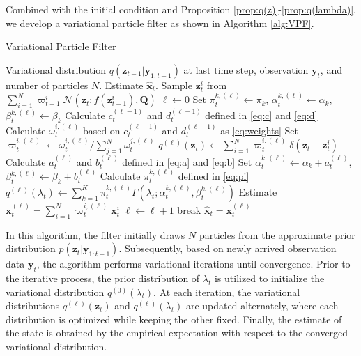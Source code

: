 \documentclass[10pt,twocolumn,twoside]{IEEEtran}
\newcommand{\x}{{ \bm{x} }}
\newcommand{\y}{{ \bm{y} }}
\newcommand{\z}{{ \bm{z} }}
\begin{document}
Combined with the initial condition and Proposition \ref{prop:q(z)}-\ref{prop:q(lambda)}, we develop a variational particle filter as shown in Algorithm \ref{alg:VPF}.
\begin{algorithm}[htbp] 
\label{alg:VPF}
\caption{Variational Particle Filter}
\begin{algorithmic}[1]
\Require Variational distribution $q(\z_{t-1}|\y_{1:t-1})$ at last time step, observation $\y_t$, and number of particles $N$.
\Ensure Estimate $\hat\x_t$.
    \State Sample $\z_t^i$ from $\sum_{i=1}^N\varpi_{t-1}^i\mathcal{N}(\z_t;\overline{f}(\z_{t-1}^i),\overline{\bm{Q}})$\;
\EndFor
\State $\ell \gets 0$\;
    \State Set $\pi_t^{k,(\ell)}\gets\pi_k$, $\alpha_t^{k,(\ell)}\gets\alpha_k$, $\beta_t^{k,(\ell)}\gets\beta_k$\;
\EndFor
{}
    \State Calculate $c_t^{(\ell-1)}$ and $d_t^{(\ell-1)}$ defined in \eqref{eq:c} and \eqref{eq:d}\;
        \State Calculate $\omega_t^{i,(\ell)}$ based on $c_t^{(\ell-1)}$ and $d_t^{(\ell-1)}$ as \eqref{eq:weights}\;
    \EndFor
        \State Set $\varpi_t^{i,(\ell)} \gets \omega_t^{i,(\ell)} / \sum_{j=1}^N\omega_t^{j,(\ell)}$\;
    \EndFor
    \State $q^{(\ell)}(\z_t) \gets \sum_{i=1}^N\varpi_t^{i,(\ell)}\delta(\z_t-\z_t^i)$\;
    \State Calculate $a_t^{(\ell)}$ and $b_t^{(\ell)}$ defined in \eqref{eq:a} and \eqref{eq:b}\;
        \State Set $\alpha_t^{k,(\ell)}\gets\alpha_k+a_t^{(\ell)}$, $\beta_t^{k,(\ell)}\gets\beta_k+b_t^{(\ell)}$\;
        \State Calculate $\pi_t^{k,(\ell)}$ defined in \eqref{eq:pi}\;
    \EndFor
    \State $q^{(\ell)}(\lambda_t) \gets \sum_{k=1}^K\pi_t^{k,(\ell)}\Gamma(\lambda_t;\alpha_t^{k,(\ell)},\beta_t^{k,(\ell)})$\;
    \State Estimate $\x_t^{(\ell)} = \sum_{i=1}^N\varpi_t^{i,(\ell)}\x_t^i$\;\label{line:estimate}
    \State $\ell \gets \ell+1$\;
    \State break
    \EndIf
\EndWhile
\State \Return $\hat{\x}_t=\x_t^{(\ell)}$\;
\end{algorithmic}
\end{algorithm}

In this algorithm, the filter initially draws $N$ particles from the approximate prior distribution $p(\z_t|\y_{1:t-1})$. Subsequently, based on newly arrived observation data $\y_t$, the algorithm performs variational iterations until convergence. Prior to the iterative process, the prior distribution of $\lambda_t$ is utilized to initialize the variational distribution $q^{(0)}(\lambda_t)$. At each iteration, the variational distributions $q^{(\ell)}(\z_t)$ and $q^{(\ell)}(\lambda_t)$ are updated alternately, where each distribution is optimized while keeping the other fixed. Finally, the estimate of the state is obtained by the empirical expectation with respect to the converged variational distribution.
\end{document}
